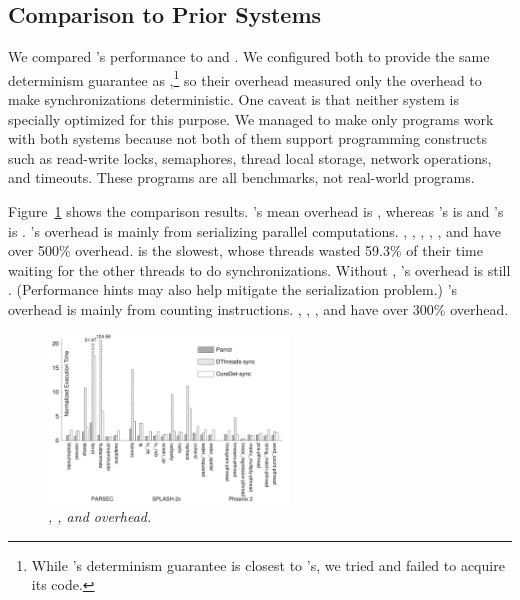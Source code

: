 
\subsection{Comparison to Prior Systems} \label{sec:parrot-comparison}

We compared \parrot's performance to \dthreads and \coredet.  We configured
both to provide the same determinism guarantee as \parrot,\footnote{While
  \kendo's determinism guarantee is closest to \parrot's, we tried and failed
  to acquire its code.}  so their overhead measured only the overhead to
make synchronizations deterministic.  One caveat is that neither system is
specially optimized for this purpose.  We managed to make only
\nprogcompared programs work with both systems because not both of them
support programming constructs such as read-write locks, semaphores,
thread local storage, network operations, and timeouts. These programs are
all benchmarks, not real-world programs.

Figure~\ref{fig:parrot-comparison} shows the comparison results.
\parrot's mean overhead is \parrotcompoverhead,
whereas \dthreads's is \dthreadssyncoverhead and \coredet's is
\coredetoverhead. 
\dthreads's overhead is mainly from serializing
parallel computations. \dedup, \ferret, \fluidanimate, 
\barnes, \radiosity, and \raytrace have over 500\%
overhead.  \fluidanimate is the slowest, whose threads wasted 59.3\% of their time
waiting for the other threads to do synchronizations.
Without \fluidanimate, \dthreads's overhead is still
\dthreadssyncoverheadnoflui.  (Performance hints may also help
\dthreads mitigate the serialization problem.)  \coredet's overhead is
mainly from counting instructions. \ferret, \fluidanimate, \barnes, and
\raytrace have over 300\% overhead.

\begin{figure}[t]
\centering
\includegraphics[width=0.57\textwidth]{parrot/figures/comparison}
\vspace{-.2in}
\caption{{\em \parrot, \dthreads, and \coredet overhead.}} \label{fig:parrot-comparison}
\vspace{-.0in}
\end{figure}

